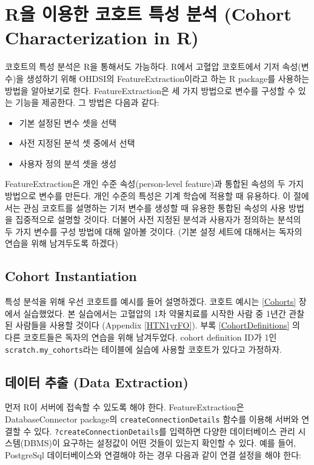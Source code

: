 \documentclass[11pt]{book}
\providecommand{\tightlist}{%
  \setlength{\itemsep}{0pt}\setlength{\parskip}{0pt}}
\theoremstyle{definition}
\theoremstyle{definition}
\theoremstyle{definition}
\theoremstyle{remark}
\begin{document}
\section{R을 이용한 코호트 특성 분석 (Cohort Characterization in
R)}\label{r-----cohort-characterization-in-r}

코호트의 특성 분석은 R을 통해서도 가능하다. R에서 고혈압 코호트에서 기저
속성(변수)을 생성하기 위해 OHDSI의 FeatureExtraction이라고 하는 R
package를 사용하는 방법을 알아보기로 한다. FeatureExtraction은 세 가지
방법으로 변수를 구성할 수 있는 기능을 제공한다. 그 방법은 다음과 같다:

\begin{itemize}
\tightlist
\item
  기본 설정된 변수 셋을 선택
\item
  사전 지정된 분석 셋 중에서 선택
\item
  사용자 정의 분석 셋을 생성
\end{itemize}

FeatureExtraction은 개인 수준 속성(person-level feature)과 통합된 속성의
두 가지 방법으로 변수를 만든다. 개인 수준의 특성은 기계 학습에 적용할 때
유용하다. 이 절에서는 관심 코호트를 설명하는 기저 변수를 생성할 때
유용한 통합된 속성의 사용 방법을 집중적으로 설명할 것이다. 더불어 사전
지정된 분석과 사용자가 정의하는 분석의 두 가지 변수를 구성 방법에 대해
알아볼 것이다. (기본 설정 세트에 대해서는 독자의 연습을 위해 남겨두도록
하겠다)

\subsection{Cohort Instantiation}\label{cohort-instantiation}

특성 분석을 위해 우선 코호트를 예시를 들어 설명하겠다. 코호트 예시는
\ref{Cohorts} 장에서 실습했었다. 본 실습에서는 고혈압의 1차 약물치료를
시작한 사람 중 1년간 관찰된 사람들을 사용할 것이다 (Appendix
\ref{HTN1yrFO}). 부록 \ref{CohortDefinitions} 의 다른 코호트들은 독자의
연습을 위해 남겨두었다. cohort definition ID가 1인
\texttt{scratch.my\_cohorts}라는 테이블에 실습에 사용할 코호트가 있다고
가정하자.

\subsection{데이터 추출 (Data Extraction)}\label{--data-extraction}

먼저 R이 서버에 접속할 수 있도록 해야 한다. FeatureExtraction은
DatabaseConnector package의 \texttt{createConnectionDetails} 함수를
이용해 서버와 연결할 수 있다. \texttt{?createConnectionDetails}를
입력하면 다양한 데이터베이스 관리 시스템(DBMS)이 요구하는 설정값이 어떤
것들이 있는지 확인할 수 있다. 예를 들어, PostgreSql 데이터베이스와
연결해야 하는 경우 다음과 같이 연결 설정을 해야 한다:
\end{document}
